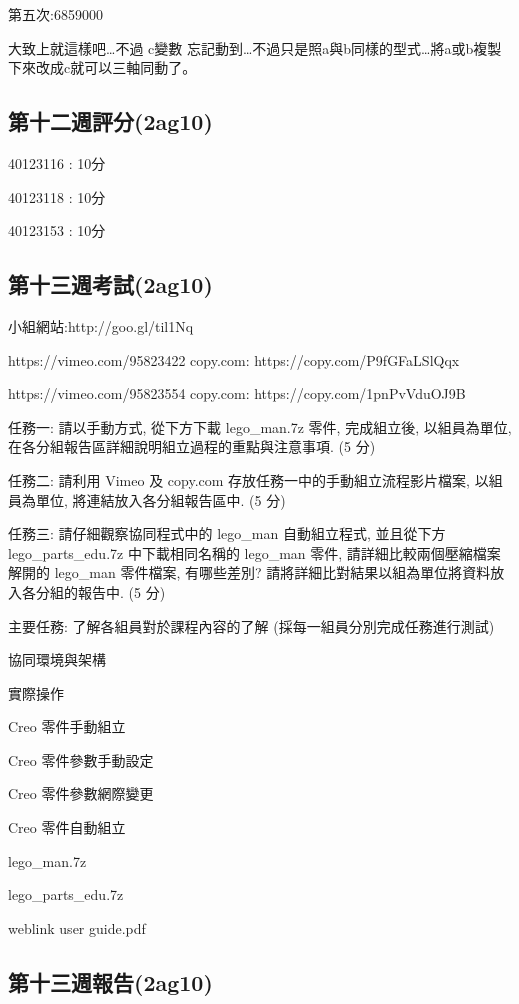 \documentclass[]{article}
\begin{document}
第五次:6859000

大致上就這樣吧\ldots{}不過 c變數
忘記動到\ldots{}不過只是照a與b同樣的型式\ldots{}將a或b複製下來改成c就可以三軸同動了。

\subsection{第十二週評分(2ag10)}\label{ux7b2cux5341ux4e8cux9031ux8a55ux52062ag10}

40123116 : 10分

40123118 : 10分

40123153 : 10分

\subsection{第十三週考試(2ag10)}\label{ux7b2cux5341ux4e09ux9031ux8003ux8a662ag10}

小組網站:http://goo.gl/til1Nq

https://vimeo.com/95823422 copy.com: https://copy.com/P9fGFaLSlQqx

https://vimeo.com/95823554 copy.com: https://copy.com/1pnPvVduOJ9B

任務一: 請以手動方式, 從下方下載 lego\_man.7z 零件, 完成組立後,
以組員為單位, 在各分組報告區詳細說明組立過程的重點與注意事項. (5 分)

任務二: 請利用 Vimeo 及 copy.com 存放任務一中的手動組立流程影片檔案,
以組員為單位, 將連結放入各分組報告區中. (5 分)

任務三: 請仔細觀察協同程式中的 lego\_man 自動組立程式, 並且從下方
lego\_parts\_edu.7z 中下載相同名稱的 lego\_man 零件,
請詳細比較兩個壓縮檔案解開的 lego\_man 零件檔案, 有哪些差別?
請將詳細比對結果以組為單位將資料放入各分組的報告中. (5 分)

主要任務: 了解各組員對於課程內容的了解 (採每一組員分別完成任務進行測試)

協同環境與架構

實際操作

Creo 零件手動組立

Creo 零件參數手動設定

Creo 零件參數網際變更

Creo 零件自動組立

lego\_man.7z

lego\_parts\_edu.7z

weblink user guide.pdf

\subsection{第十三週報告(2ag10)}\label{ux7b2cux5341ux4e09ux9031ux5831ux544a2ag10}
\end{document}
